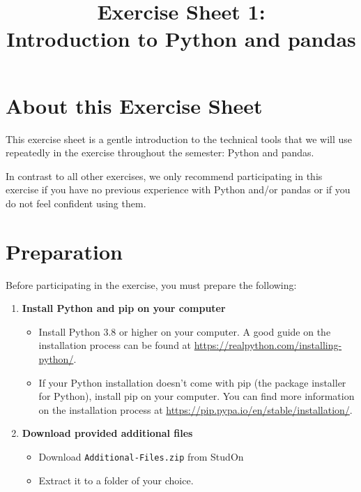 \documentclass[
english,
smallborders
]{i6prcsht}
\begin{document}
\title{Exercise Sheet 1: \\ Introduction to Python and pandas}
\maketitle
\vspace*{-2cm}

\section*{About this Exercise Sheet}

This exercise sheet is a gentle introduction to the technical tools that we will use repeatedly in the exercise throughout the semester: Python and pandas.

In contrast to all other exercises, we only recommend participating in this exercise if you have no previous experience with Python and/or pandas or if you do not feel confident using them.

\section*{Preparation}

Before participating in the exercise, you must prepare the following:

\begin{enumerate}
	\item \textbf{Install Python and pip on your computer}

	      \begin{itemize}
		      \item Install Python 3.8 or higher on your computer.
		            A good guide on the installation process can be found at \url{https://realpython.com/installing-python/}.
		      \item If your Python installation doesn't come with pip (the package installer for Python), install pip on your computer.
		            You can find more information on the installation process at \url{https://pip.pypa.io/en/stable/installation/}.
	      \end{itemize}

	\item \textbf{Download provided additional files}

	      \begin{itemize}
		      \item Download \texttt{Additional-Files.zip} from StudOn
		      \item Extract it to a folder of your choice.
	      \end{itemize}

\end{enumerate}
\end{document}
